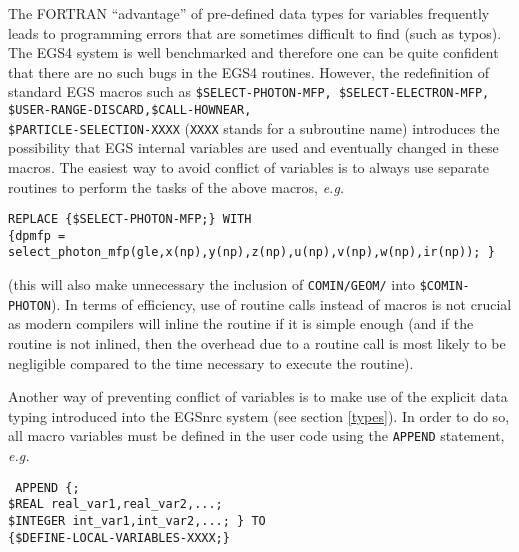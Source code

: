 The FORTRAN ``advantage'' of pre-defined data types for 
variables frequently leads to programming errors that are 
sometimes difficult to find (such as typos). 
The EGS4 system is well benchmarked 
and therefore one can be quite confident that there are no 
such bugs in the EGS4 routines. However, the 
redefinition of standard EGS macros such as 
{\tt \$SELECT-PHOTON-MFP, \$SELECT-ELECTRON-MFP, 
\$USER-RANGE-DISCARD,\$CALL-HOWNEAR,\\ \$PARTICLE-SELECTION-XXXX} 
({\tt XXXX} stands for a subroutine name) introduces the possibility 
that EGS internal variables are used and eventually changed in 
these macros. The easiest way to avoid conflict of variables is 
to always use separate routines to perform the tasks of the 
above macros, {\em e.g.}
\begin{flushleft}
{\tt REPLACE \{\$SELECT-PHOTON-MFP;\} WITH \\
\{dpmfp = select\_photon\_mfp(gle,x(np),y(np),z(np),u(np),v(np),w(np),ir(np));
\} }\\
\end{flushleft}

\noindent
(this will also make unnecessary the inclusion of 
{\tt COMIN/GEOM/} into {\tt \$COMIN-PHOTON}). In terms of efficiency,  
use of routine calls instead of macros is not crucial as 
modern compilers will inline the routine if it is simple enough 
(and if the routine is not inlined, then the overhead 
due to a routine call is most likely to be negligible compared 
to the time necessary to execute the routine).  

Another way of preventing conflict of variables is to make 
use of the explicit data typing introduced into the EGSnrc system 
(see section \ref{types}). In order to do so, all macro variables 
must be defined in the user code using the {\tt APPEND} statement, 
{\em e.g.}
\begin{flushleft}
{\tt 
APPEND \{;\\
\$REAL real\_var1,real\_var2,...;\\
\$INTEGER int\_var1,int\_var2,...; \}
\tt TO\\
\{\$DEFINE-LOCAL-VARIABLES-XXXX;\} }\\
\end{flushleft}

